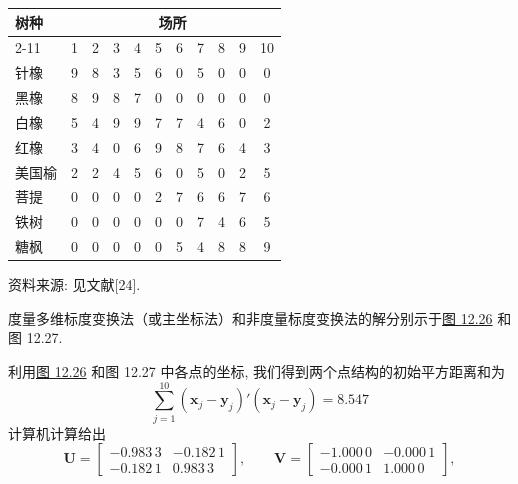 \begin{mvtable}
\label{tab:12.10}
\begin{tabular}{l|cccccccccc}
\toprule
树种 & \multicolumn{10}{c}{场\quad 所}\\
\cmidrule(lr){2-11}
 & 1 & 2 & 3 & 4 & 5 & 6 & 7 & 8 & 9 & 10\\
\midrule
针橡 & 9 & 8 & 3 & 5 & 6 & 0 & 5 & 0 & 0 & 0\\
黑橡 & 8 & 9 & 8 & 7 & 0 & 0 & 0 & 0 & 0 & 0\\
白橡 & 5 & 4 & 9 & 9 & 7 & 7 & 4 & 6 & 0 & 2\\
红橡 & 3 & 4 & 0 & 6 & 9 & 8 & 7 & 6 & 4 & 3\\
美国榆 & 2 & 2 & 4 & 5 & 6 & 0 & 5 & 0 & 2 & 5\\
菩提 & 0 & 0 & 0 & 0 & 2 & 7 & 6 & 6 & 7 & 6\\
铁树 & 0 & 0 & 0 & 0 & 0 & 0 & 7 & 4 & 6 & 5\\
糖枫 & 0 & 0 & 0 & 0 & 0 & 5 & 4 & 8 & 8 & 9\\
\bottomrule
\end{tabular}

资料来源: 见文献[24].
\end{mvtable}

度量多维标度变换法（或主坐标法）和非度量标度变换法的解分别示于\hyperref[fig:12.26]{图 12.26} 和图 12.27.

利用\hyperref[fig:12.26]{图 12.26} 和图 12.27 中各点的坐标, 我们得到两个点结构的初始平方距离和为
\[
\sum_{j=1}^{10}(\mathbf{x}_{j}-\mathbf{y}_{j})'(\mathbf{x}_{j}-\mathbf{y}_{j})=8.547
\]
计算机计算给出
\[
\mathbf{U}=\begin{bmatrix}-0.983\,3&-0.182\,1\\-0.182\,1&0.983\,3\end{bmatrix},\qquad
\mathbf{V}=\begin{bmatrix}-1.000\,0&-0.000\,1\\-0.000\,1&1.000\,0\end{bmatrix},
\]
